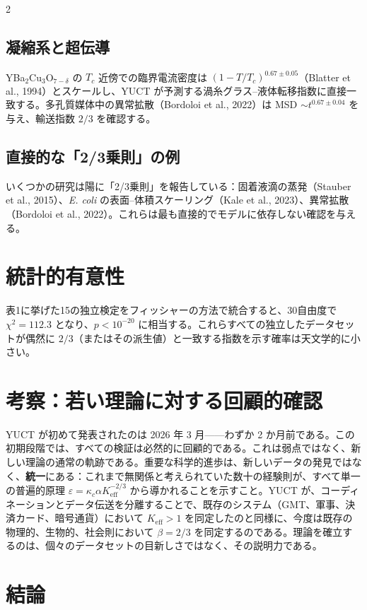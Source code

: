 \documentclass[11pt,a4paper]{article}
\begin{document}
\begin{multicols}{2}
		\subsection{凝縮系と超伝導}
		YBa\(_2\)Cu\(_3\)O\(_{7-\delta}\) の \(T_c\) 近傍での臨界電流密度は \((1-T/T_c)^{0.67\pm0.05}\)（Blatter et al., 1994）とスケールし、YUCT が予測する渦糸グラス--液体転移指数に直接一致する。多孔質媒体中の異常拡散（Bordoloi et al., 2022）は MSD \(\sim t^{0.67\pm0.04}\) を与え、輸送指数 \(2/3\) を確認する。
		
		\subsection{直接的な「2/3乗則」の例}
		いくつかの研究は陽に「2/3乗則」を報告している：固着液滴の蒸発（Stauber et al., 2015）、\emph{E. coli} の表面--体積スケーリング（Kale et al., 2023）、異常拡散（Bordoloi et al., 2022）。これらは最も直接的でモデルに依存しない確認を与える。
		
		\section{統計的有意性}
		
		表1に挙げた15の独立検定をフィッシャーの方法で統合すると、30自由度で \(\chi^2 = 112.3\) となり、\(p < 10^{-20}\) に相当する。これらすべての独立したデータセットが偶然に \(2/3\)（またはその派生値）と一致する指数を示す確率は天文学的に小さい。
		
		\section{考察：若い理論に対する回顧的確認}
		
		YUCT が初めて発表されたのは 2026 年 3 月——わずか 2 か月前である。この初期段階では、すべての検証は必然的に回顧的である。これは弱点ではなく、新しい理論の通常の軌跡である。重要な科学的進歩は、新しいデータの発見ではなく、\textbf{統一}にある：これまで無関係と考えられていた数十の経験則が、すべて単一の普遍的原理 \(\varepsilon = \kappa_c \alpha K_{\mathrm{eff}}^{-2/3}\) から導かれることを示すこと。YUCT が、コーディネーションとデータ伝送を分離することで、既存のシステム（GMT、軍事、決済カード、暗号通貨）において \(K_{\mathrm{eff}} > 1\) を同定したのと同様に、今度は既存の物理的、生物的、社会則において \(\beta = 2/3\) を同定するのである。理論を確立するのは、個々のデータセットの目新しさではなく、その説明力である。
		
		\section{結論}
		

\end{multicols}
\end{document}
